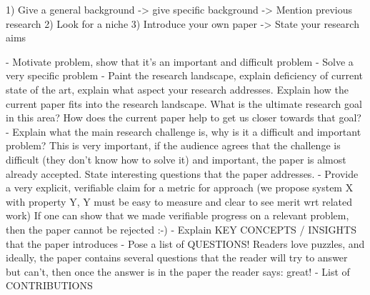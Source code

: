 1) Give a general background -> give specific background -> Mention previous
research
2) Look for a niche
3) Introduce your own paper -> State your research aims


- Motivate problem, show that it's an important and difficult problem
  - Solve a very specific problem
- Paint the research landscape, explain deficiency of current state of
  the art, explain what aspect your research addresses. Explain how
  the current paper fits into the research landscape.
  What is the ultimate research goal in this area? How does the
  current paper help to get us closer towards that goal?
- Explain what the main research challenge is, why is it a difficult
  and important problem? This is very important, if the audience
  agrees that the challenge is difficult (they don't know how to solve
  it) and important, the paper is almost already accepted.
  State interesting questions that the paper addresses.
- Provide a very explicit, verifiable claim for a metric for approach
  (we propose system X with property Y, Y must be easy to measure and
   clear to see merit wrt related work)
  If one can show that we made verifiable progress on a relevant
  problem, then the paper cannot be rejected :-)
- Explain KEY CONCEPTS / INSIGHTS that the paper introduces
- Pose a list of QUESTIONS! Readers love puzzles, and ideally, the
  paper contains several questions that the reader will try to answer
  but can't, then once the answer is in the paper the reader says: great!
- List of CONTRIBUTIONS
